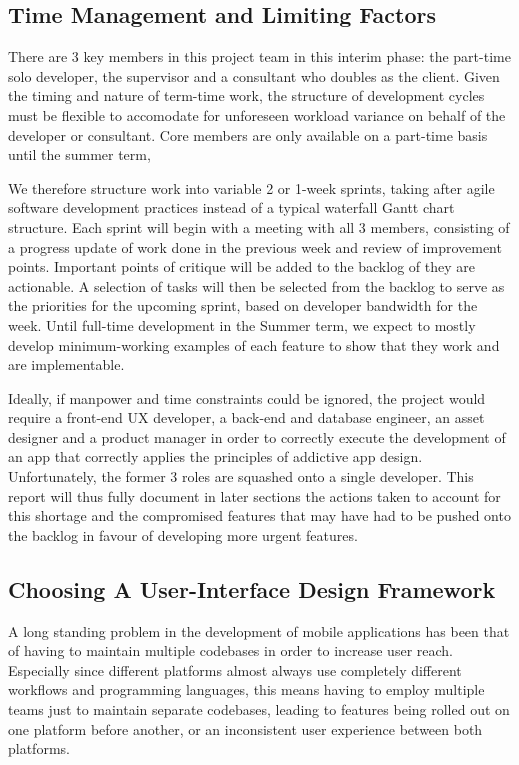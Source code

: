 \subsection{Time Management and Limiting Factors}
There are 3 key members in this project team in this interim phase: the part-time solo developer, the supervisor and a consultant who doubles as the client. Given the timing and nature of term-time work, the structure of development cycles must be flexible to accomodate for unforeseen workload variance on behalf of the developer or consultant. Core members are only available on a part-time basis until the summer term,

We therefore structure work into variable 2 or 1-week sprints, taking after agile software development practices instead of a typical waterfall Gantt chart structure. Each sprint will begin with a meeting with all 3 members, consisting of a progress update of work done in the previous week and review of improvement points. Important points of critique will be added to the backlog of they are actionable. A selection of tasks will then be selected from the backlog to serve as the priorities for the upcoming sprint, based on developer bandwidth for the week. Until full-time development in the Summer term, we expect to mostly develop minimum-working examples of each feature to show that they work and are implementable.

Ideally, if manpower and time constraints could be ignored, the project would require a front-end UX developer, a back-end and database engineer, an asset designer and a product manager in order to correctly execute the development of an app that correctly applies the principles of addictive app design. Unfortunately, the former 3 roles are squashed onto a single developer. This report will thus fully document in later sections the actions taken to account for this shortage and the compromised features that may have had to be pushed onto the backlog in favour of developing more urgent features.

\subsection{Choosing A User-Interface Design Framework}
A long standing problem in the development of mobile applications has been that of having to maintain multiple codebases in order to increase user reach. Especially since different platforms almost always use completely different workflows and programming languages, this means having to employ multiple teams just to maintain separate codebases, leading to features being rolled out on one platform before another, or an inconsistent user experience between both platforms.

